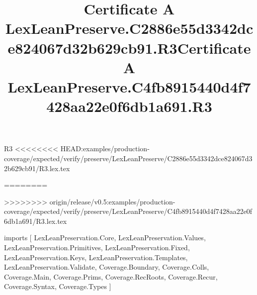 \begin{lexlean}{R3}
<<<<<<<< HEAD:examples/production-coverage/expected/verify/preserve/LexLeanPreserve/C2886e55d3342dce824067d32b629cb91/R3.lex.tex
\title{Certificate A LexLeanPreserve.C2886e55d3342dce824067d32b629cb91.R3}
========
\title{Certificate A LexLeanPreserve.C4fb8915440d4f7428aa22e0f6db1a691.R3}
>>>>>>>> origin/release/v0.5:examples/production-coverage/expected/verify/preserve/LexLeanPreserve/C4fb8915440d4f7428aa22e0f6db1a691/R3.lex.tex
\begin{coremodule}
imports [
  LexLeanPreservation.Core,
  LexLeanPreservation.Values,
  LexLeanPreservation.Primitives,
  LexLeanPreservation.Fixed,
  LexLeanPreservation.Keys,
  LexLeanPreservation.Templates,
  LexLeanPreservation.Validate,
  Coverage.Boundary,
  Coverage.Colls,
  Coverage.Main,
  Coverage.Prims,
  Coverage.RecRoots,
  Coverage.Recur,
  Coverage.Syntax,
  Coverage.Types
]


\end{coremodule}
\end{lexlean}
